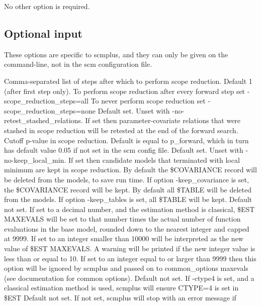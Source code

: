 \documentclass[hideglossary,notoc,hidelof,hidelot,hideTheSignaturePage,hideLinkCurrent,hideloa,pdfLatex,noClient,notitle,hideConfidential]{PMXstyle-20170118kajsa4}
\begin{document}
No other option is required.

\subsection{Optional input}
These options are specific to scmplus, and they can only be given on the command-line, not in the
scm configuration file.

\begin{optionlist}
Comma-separated list of steps after which to perform scope reduction. Default 1 (after first step only).
To perform scope reduction after every forward step set -scope\_reduction\_steps=all 
To never perform scope reduction set -scope\_reduction\_steps=none 
\nextopt
{}
Default set. Unset with -no-retest\_stashed\_relations.
If set then parameter-covariate relations that were stashed
in scope reduction will be retested at the end of the forward search.
\nextopt
{}
Cutoff p-value in scope reduction. Default is equal to p\_forward,
which in turn has default value 0.05 if not set in the scm config file.
\nextopt
{}
Default set. Unset with -no-keep\_local\_min. If set then candidate models that
terminated with local minimum are kept in scope reduction.
By default the \$COVARIANCE record will be deleted from the models, to save run time.
If option -keep\_covariance is set, the \$COVARIANCE record will be kept.
\nextopt
{}
By default all \$TABLE will be deleted from the models.
If option -keep\_tables is set, all \$TABLE will be kept.
\nextopt
{}
Default not set. 
If set to a decimal number, and the estimation method is classical,
\$EST MAXEVALS will be set to that number times 
the actual number of function evaluations in the base model,
rounded down to the nearest integer and capped at 9999. 
If set to an integer smaller than 10000 will be interpreted as the new value
of \$EST MAXEVALS. A warning will be printed if the new integer value is 
less than or equal to 10. 
If set to an integer equal to or larger than 9999 then this option
will be ignored by scmplus and passed on to common\_options maxevals
(see documentation for common options).
Default not set.
If -ctype4 is set, and a classical estimation method is used,
scmplus will ensure CTYPE=4 is set in \$EST
\nextopt
{}
Default not set.
If not set, scmplus will stop with an error message if

\end{optionlist}
\end{document}
